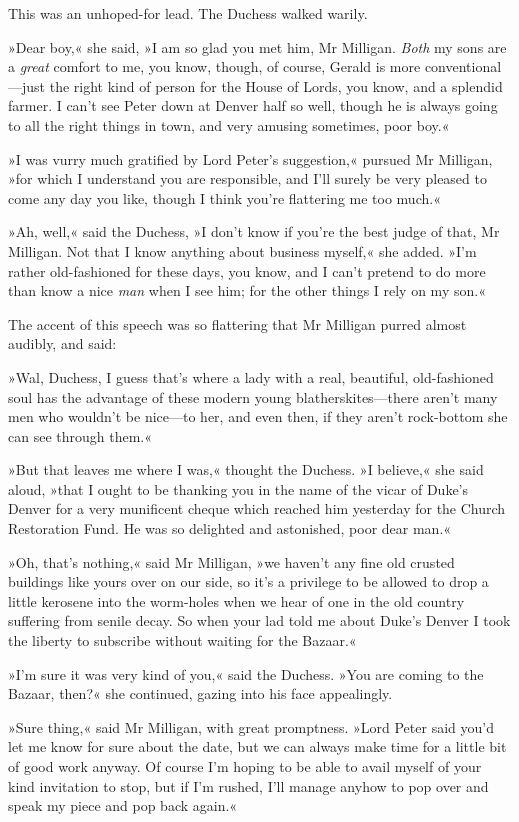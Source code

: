 This was an unhoped-for lead. The Duchess walked warily.

»Dear boy,« she said, »I am so glad you met him, Mr Milligan. \textit{Both} my sons are a \textit{great} comfort to me, you know, though, of course, Gerald is more conventional—just the right kind of person for the House of Lords, you know, and a splendid farmer. I can't see Peter down at Denver half so well, though he is always going to all the right things in town, and very amusing sometimes, poor boy.«

»I was vurry much gratified by Lord Peter's suggestion,« pursued Mr Milligan, »for which I understand you are responsible, and I'll surely be very pleased to come any day you like, though I think you're flattering me too much.«

»Ah, well,« said the Duchess, »I don't know if you're the best judge of that, Mr Milligan. Not that I know anything about business myself,« she added. »I'm rather old-fashioned for these days, you know, and I can't pretend to do more than know a nice \textit{man} when I see him; for the other things I rely on my son.«

The accent of this speech was so flattering that Mr Milligan purred almost audibly, and said:

»Wal, Duchess, I guess that's where a lady with a real, beautiful, old-fashioned soul has the advantage of these modern young blatherskites—there aren't many men who wouldn't be nice—to her, and even then, if they aren't rock-bottom she can see through them.«

»But that leaves me where I was,« thought the Duchess. »I believe,« she said aloud, »that I ought to be thanking you in the name of the vicar of Duke's Denver for a very munificent cheque which reached him yesterday for the Church Restoration Fund. He was so delighted and astonished, poor dear man.«

»Oh, that's nothing,« said Mr Milligan, »we haven't any fine old crusted buildings like yours over on our side, so it's a privilege to be allowed to drop a little kerosene into the worm-holes when we hear of one in the old country suffering from senile decay. So when your lad told me about Duke's Denver I took the liberty to subscribe without waiting for the Bazaar.«

»I'm sure it was very kind of you,« said the Duchess. »You are coming to the Bazaar, then?« she continued, gazing into his face appealingly.

»Sure thing,« said Mr Milligan, with great promptness. »Lord Peter said you'd let me know for sure about the date, but we can always make time for a little bit of good work anyway. Of course I'm hoping to be able to avail myself of your kind invitation to stop, but if I'm rushed, I'll manage anyhow to pop over and speak my piece and pop back again.«

